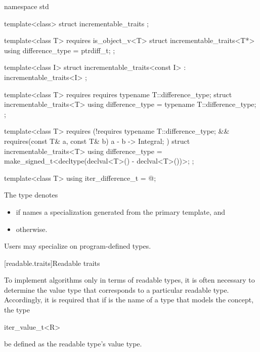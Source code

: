 %
\begin{codeblock}
namespace std {
  template<class> struct incrementable_traits { };

  template<class T>
    requires is_object_v<T>
  struct incrementable_traits<T*> {
    using difference_type = ptrdiff_t;
  };

  template<class I>
  struct incrementable_traits<const I>
    : incrementable_traits<I> { };

  template<class T>
    requires requires { typename T::difference_type; }
  struct incrementable_traits<T> {
    using difference_type = typename T::difference_type;
  };

  template<class T>
    requires (!requires { typename T::difference_type; } &&
              requires(const T& a, const T& b) { { a - b } -> Integral; })
  struct incrementable_traits<T> {
    using difference_type = make_signed_t<decltype(declval<T>() - declval<T>())>;
  };

  template<class T>
    using iter_difference_t = @\seebelow@;
}
\end{codeblock}

%
\pnum
The type  denotes
\begin{itemize}
\item
{}
if  names a specialization
generated from the primary template, and

\item
{} otherwise.
\end{itemize}

\pnum
Users may specialize  on program-defined types.

[readable.traits]{Readable traits}

\pnum
To implement algorithms only in terms of readable types, it is often necessary
to determine the value type that corresponds to a particular readable type.
Accordingly, it is required that if  is the name of a type that
models the  concept,
the type
\begin{codeblock}
iter_value_t<R>
\end{codeblock}
be defined as the readable type's value type.

